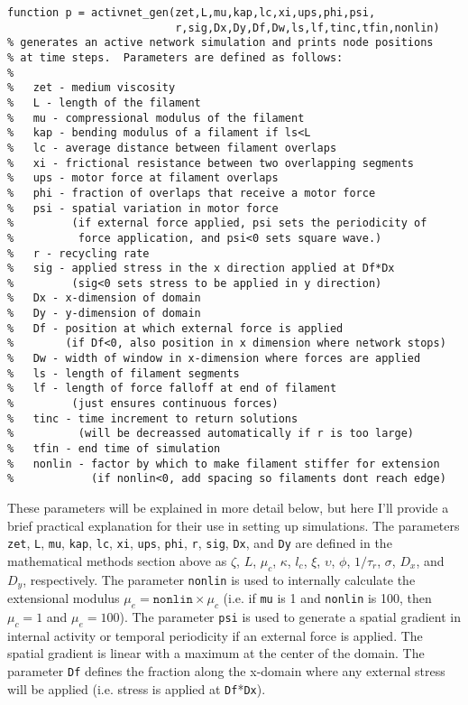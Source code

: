 \begin{verbatim}
function p = activnet_gen(zet,L,mu,kap,lc,xi,ups,phi,psi,
                          r,sig,Dx,Dy,Df,Dw,ls,lf,tinc,tfin,nonlin)
% generates an active network simulation and prints node positions
% at time steps.  Parameters are defined as follows:
%
%   zet - medium viscosity
%   L - length of the filament
%   mu - compressional modulus of the filament
%   kap - bending modulus of a filament if ls<L
%   lc - average distance between filament overlaps
%   xi - frictional resistance between two overlapping segments
%   ups - motor force at filament overlaps
%   phi - fraction of overlaps that receive a motor force
%   psi - spatial variation in motor force 
%         (if external force applied, psi sets the periodicity of 
%          force application, and psi<0 sets square wave.)
%   r - recycling rate
%   sig - applied stress in the x direction applied at Df*Dx
%         (sig<0 sets stress to be applied in y direction)
%   Dx - x-dimension of domain
%   Dy - y-dimension of domain
%   Df - position at which external force is applied
%        (if Df<0, also position in x dimension where network stops)
%   Dw - width of window in x-dimension where forces are applied
%   ls - length of filament segments
%   lf - length of force falloff at end of filament 
%         (just ensures continuous forces)
%   tinc - time increment to return solutions 
%          (will be decreassed automatically if r is too large)
%   tfin - end time of simulation
%   nonlin - factor by which to make filament stiffer for extension
%            (if nonlin<0, add spacing so filaments dont reach edge)
\end{verbatim}

These parameters will be explained in more detail below, but here I'll provide a brief practical explanation for their use in setting up simulations.  The parameters \texttt{zet}, \texttt{L}, \texttt{mu}, \texttt{kap}, \texttt{lc}, \texttt{xi}, \texttt{ups}, \texttt{phi}, \texttt{r}, \texttt{sig}, \texttt{Dx}, and \texttt{Dy} are defined in the mathematical methods section above as $\zeta$, $L$, $\mu_c$, $\kappa$, $l_c$, $\xi$, $\upsilon$, $\phi$, $1/\tau_r$, $\sigma$, $D_x$, and $D_y$, respectively. The parameter \texttt{nonlin} is used to internally calculate the extensional modulus $\mu_e = \texttt{nonlin} \times \mu_c$ (i.e. if \texttt{mu} is 1 and \texttt{nonlin} is 100, then $\mu_c=1$ and $\mu_e=100$).  The parameter \texttt{psi} is used to generate a spatial gradient in internal activity or temporal periodicity if an external force is applied. The spatial gradient is linear with a maximum at the center of the domain.  The parameter \texttt{Df} defines the fraction along the x-domain where any external stress will be applied (i.e. stress is applied at \texttt{Df}*\texttt{Dx}).

